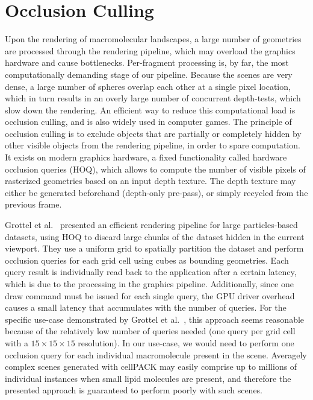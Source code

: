
\section{Occlusion Culling}


Upon the rendering of macromolecular landscapes, a large number of geometries are processed through the rendering pipeline, which may overload the graphics hardware and cause bottlenecks.
Per-fragment processing is, by far, the most computationally demanding stage of our pipeline.
Because the scenes are very dense, a large number of spheres overlap each other at a single pixel location, which in turn results in an overly large number of concurrent depth-tests, which slow down the rendering.
An efficient way to reduce this computational load is occlusion culling, and is also widely used in computer games.
The principle of occlusion culling is to exclude objects that are partially or completely hidden by other visible objects from the rendering pipeline, in order to spare computation.
It exists on modern graphics hardware, a fixed functionality called hardware occlusion queries (HOQ), which allows to compute the number of visible pixels of rasterized geometries based on an input depth texture.
The depth texture may either be generated beforehand (depth-only pre-pass), or simply recycled from the previous frame.

Grottel et al.~\cite{grottel2010coherent} presented an efficient rendering pipeline for large particles-based datasets, using HOQ to discard large chunks of the dataset hidden in the current viewport.
They use a uniform grid to spatially partition the dataset and perform occlusion queries for each grid cell using cubes as bounding geometries.
Each query result is individually read back to the application after a certain latency, which is due to the processing in the graphics pipeline.
Additionally, since one draw command must be issued for each single query, the GPU driver overhead causes a small latency that accumulates with the number of queries.
For the specific use-case demonstrated by Grottel et al.~\cite{grottel2010coherent}, this approach seems reasonable because of the relatively low number of queries needed (one query per grid cell with a $15\times15\times15$ resolution).
In our use-case, we would need to perform one occlusion query for each individual macromolecule present in the scene.
Averagely complex scenes generated with cellPACK may easily comprise up to millions of individual instances when small lipid molecules are present, and therefore the presented approach is guaranteed to perform poorly with such scenes.

